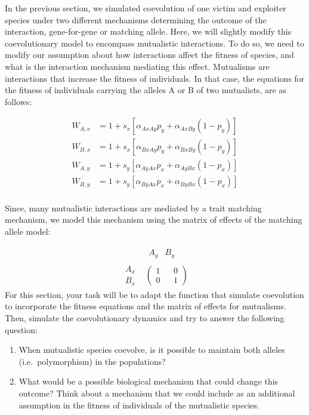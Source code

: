 \documentclass[
]{book}
\begin{document}
In the previous section, we simulated coevolution of one victim and exploiter species under two different mechanisms determining the outcome of the interaction, gene-for-gene or matching allele. Here, we will slightly modify this coevolutionary model to encompass mutualistic interactions. To do so, we need to modify our assumption about how interactions affect the fitness of species, and what is the interaction mechanism mediating this effect. Mutualisms are interactions that increase the fitness of individuals. In that case, the equations for the fitness of individuals carrying the alleles A or B of two mutualists, are as follows:

\[\begin{aligned}
W_{A,x}&=1+s_{x}\left[\alpha_{AxAy}p_{y}+\alpha_{AxBy}(1-p_{y})\right] \\
W_{B,x}&=1+s_{x}\left[\alpha_{BxAy}p_{y}+\alpha_{BxBy}(1-p_{y})\right] \\
W_{A,y}&=1+s_{y}\left[\alpha_{AyAx}p_{x}+\alpha_{AyBx}(1-p_{x})\right] \\
W_{B,y}&=1+s_{y}\left[\alpha_{ByAx}p_{x}+\alpha_{ByBx}(1-p_{x})\right] \\
\end{aligned}\]

Since, many mutualistic interactions are mediated by a trait matching mechanism, we model this mechanism using the matrix of effects of the matching allele model:

\[
\begin{array}{cc} &
\begin{array}{cc} A_{y} & B_{y} \end{array}
\\
\begin{array}{cc}
A_{x} \\
B_{x} \end{array}
&
\left(
\begin{array}{cc}
1 && 0 \\
0 && 1 \end{array}
\right)\end{array}
\]
For this section, your task will be to adapt the function that simulate coevolution to incorporate the fitness equations and the matrix of effects for mutualisms. Then, simulate the coevolutionary dynamics and try to answer the following question:

\begin{enumerate}
\def\labelenumi{\arabic{enumi}.}
\item
  When mutualistic species coevolve, is it possible to maintain both alleles (i.e.~polymorphism) in the populations?
\item
  What would be a possible biological mechanism that could change this outcome? Think about a mechanism that we could include as an additional assumption in the fitness of individuals of the mutualistic species.
\end{enumerate}

  
\end{document}
